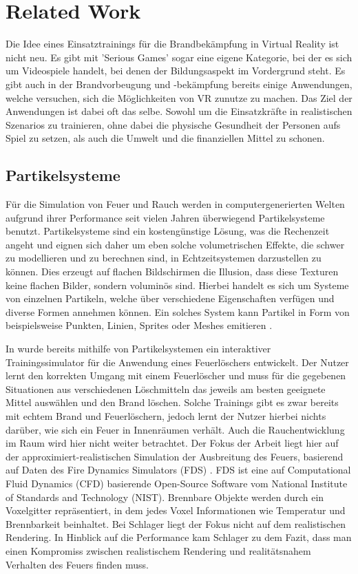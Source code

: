 \section{Related Work}
\label{sec:2}

Die Idee eines Einsatztrainings für die Brandbekämpfung in Virtual Reality ist nicht neu. Es gibt mit
'Serious Games' sogar eine eigene Kategorie, bei der es sich um Videospiele handelt, bei denen der
Bildungsaspekt im Vordergrund steht. Es gibt auch in der Brandvorbeugung und -bekämpfung bereits einige Anwendungen,
welche versuchen, sich die Möglichkeiten von VR zunutze zu machen.
Das Ziel der Anwendungen ist dabei oft das selbe. Sowohl um die Einsatzkräfte in realistischen Szenarios zu trainieren,
ohne dabei die physische Gesundheit der Personen aufs Spiel zu setzen, als auch die Umwelt und die finanziellen Mittel zu schonen.


\subsection{Partikelsysteme}
Für die Simulation von Feuer und Rauch werden in computergenerierten Welten aufgrund ihrer  Performance seit vielen Jahren 
überwiegend Partikelsysteme benutzt. 
Partikelsysteme sind ein kostengünstige Lösung, was die Rechenzeit angeht und eignen sich daher um eben solche
volumetrischen Effekte, die schwer zu modellieren und zu berechnen sind, in Echtzeitsystemen darzustellen zu können. 
Dies erzeugt auf flachen Bildschirmen die Illusion, dass diese Texturen keine flachen Bilder, 
sondern voluminös sind. Hierbei handelt es sich um Systeme von einzelnen Partikeln, welche über verschiedene 
Eigenschaften verfügen und diverse Formen annehmen können. Ein solches System kann Partikel in Form von beispielsweise Punkten, 
Linien, Sprites oder Meshes emitieren \parencite{Reeves1983}.

In \textcite{Schlager2017} wurde bereits mithilfe von Partikelsystemen ein interaktiver Trainingssimulator für die Anwendung 
eines Feuerlöschers entwickelt. Der Nutzer lernt den korrekten Umgang mit einem Feuerlöscher und muss für die gegebenen Situationen 
aus verschiedenen Löschmitteln das jeweils am besten geeignete Mittel auswählen und den Brand löschen. Solche Trainings 
gibt es zwar bereits mit echtem Brand und Feuerlöschern, jedoch lernt der Nutzer hierbei nichts darüber, wie sich ein Feuer in 
Innenräumen verhält. Auch die Rauchentwicklung im Raum wird hier nicht weiter betrachtet. Der Fokus der Arbeit liegt hier auf der 
approximiert-realistischen Simulation der Ausbreitung des Feuers, basierend auf Daten des Fire Dynamics Simulators (FDS) \parencite{FDS2004}. 
FDS ist eine auf Computational Fluid Dynamics (CFD) basierende Open-Source Software vom National Institute of Standards and Technology (NIST).
Brennbare Objekte werden durch ein Voxelgitter repräsentiert, in dem jedes Voxel Informationen wie Temperatur und Brennbarkeit beinhaltet.
Bei Schlager liegt der Fokus nicht auf dem realistischen Rendering. 
In Hinblick auf die Performance kam Schlager zu dem Fazit, dass man einen Kompromiss zwischen realistischem Rendering 
und realitätsnahem Verhalten des Feuers finden muss.



